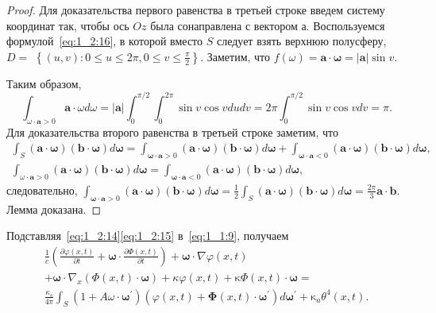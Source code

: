 \begin{proof}
    Для доказательства первого равенства в третьей строке введем систему
    координат так, чтобы ось $O z$ была сонаправлена с вектором а.
    Воспользуемся формулой~\eqref{eq:1_2:16}, в которой вместо $S$ следует
    взять верхнюю полусферу, $D=$ $\left\{(u, v): 0 \leqslant u
    \leqslant 2 \pi, 0 \leqslant v \leqslant \frac{\pi}{2}\right\}$.
    Заметим, что $f(\omega)=\mathbf{a} \cdot \boldsymbol{\omega}=|\mathbf{a}| \sin v$.

    Таким образом,
    \[
        \int_{\omega \cdot \mathbf{a}>0} \mathbf{a} \cdot \omega d \omega=|\mathbf{a}|
        \int_{0}^{\pi / 2} \int_{0}^{2 \pi} \sin v \cos v d u d v =
        2 \pi \int_{0}^{\pi / 2} \sin v \cos v d v=\pi.
    \]
    Для доказательства второго равенства в третьей строке заметим, что
    \[
        \begin{gathered}
            \int_{S}(\mathbf{a} \cdot \boldsymbol{\omega})(\mathbf{b}
            \cdot \boldsymbol{\omega}) d
            \boldsymbol{\omega}=\int_{\boldsymbol{\omega} \cdot
            \mathbf{a}>0}(\mathbf{a} \cdot \boldsymbol{\omega})(\mathbf{b}
            \cdot \mathbf{\omega}) d
            \boldsymbol{\omega}+
            \int_{\boldsymbol{\omega} \cdot \mathbf{a}<0}(\mathbf{a}
            \cdot \boldsymbol{\omega})(\mathbf{b}
            \cdot \boldsymbol{\omega}) d \boldsymbol{\omega}, \\
            \int_{\omega \cdot \mathbf{a}>0}(\mathbf{a}
            \cdot \boldsymbol{\omega})(\mathbf{b}
            \cdot \boldsymbol{\omega}) d
            \boldsymbol{\omega}=\int_{\boldsymbol{\omega}
            \cdot \mathbf{a}<0}(\mathbf{a}
            \cdot \boldsymbol{\omega})(\mathbf{b}
            \cdot \boldsymbol{\omega}) d \boldsymbol{\omega},
        \end{gathered}
    \]
    следовательно,
    $
    \int_{\boldsymbol{\omega} \cdot \mathbf{a}>0}(\mathbf{a}
    \cdot \boldsymbol{\omega})(\mathbf{b}
    \cdot \boldsymbol{\omega}) d \boldsymbol{\omega}=
    \frac{1}{2} \int_{S}(\mathbf{a}
    \cdot \boldsymbol{\omega})(\mathbf{b}
    \cdot \boldsymbol{\omega}) d \boldsymbol{\omega}=
    \frac{2 \pi}{3} \mathbf{a} \cdot \mathbf{b}.
    $
    Лемма доказана.
\end{proof}

Подставляя~\eqref{eq:1_2:14}\eqref{eq:1_2:15} в~\eqref{eq:1_1:9}, получаем
\begin{gather*}
    \frac{1}{c}\left(\frac{\partial \varphi(x, t)}{\partial t}
    + \boldsymbol{\omega} \cdot \frac{\partial \Phi(x, t)}{\partial t}\right)
    + \boldsymbol{\omega} \cdot \nabla \varphi(x, t) \\
    + \boldsymbol{\omega} \cdot \nabla_{x}(\Phi(x, t) \cdot \boldsymbol{\omega})
    + \kappa \varphi(x, t)
    + \mathrm{\kappa} \Phi(x, t) \cdot \boldsymbol{\omega}= \\
    \frac{\kappa_{s}}{4 \pi} \int_{S}\left(1+A \omega \cdot
    \boldsymbol{\omega}^{\prime}\right)\left(\varphi(x, t)+\boldsymbol{\Phi}(x, t)
    \cdot \boldsymbol{\omega}^{\prime}\right) d \boldsymbol{\omega}^{\prime}
    + \mathrm{\kappa}_{a} \theta^{4}(x, t).
\end{gather*}

